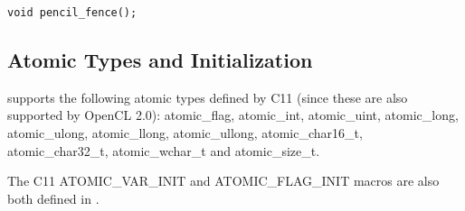 \lstinline!void pencil_fence();!


\subsection{Atomic Types and Initialization}
\pencil supports the following atomic types defined by C11 (since these are
also supported by OpenCL 2.0):
atomic_flag, atomic_int, atomic_uint, atomic_long, atomic_ulong, atomic_llong,
atomic_ullong, atomic_char16_t, atomic_char32_t, atomic_wchar_t and
atomic_size_t.

The C11 ATOMIC_VAR_INIT and ATOMIC_FLAG_INIT macros are also both defined
in \pencil.


